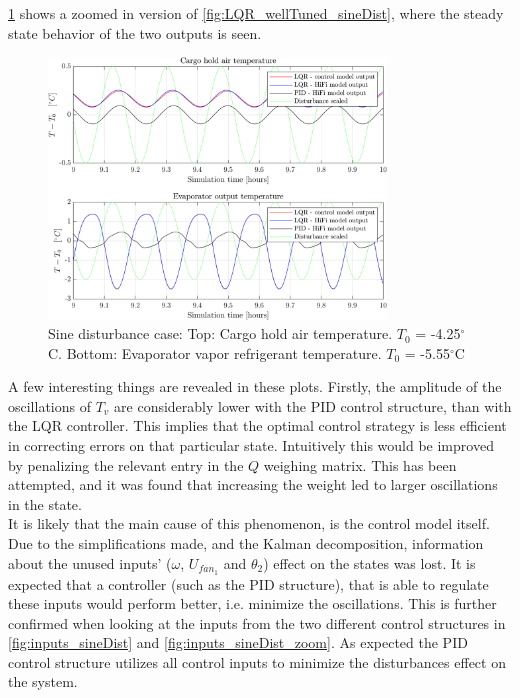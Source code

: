 \noindent \cref{fig:LQR_wellTuned_sineDist_zoom} shows a zoomed in version of \cref{fig:LQR_wellTuned_sineDist}, where the steady state behavior of the two outputs is seen.

\begin{figure}[H]
	\centering
	\includegraphics[width=0.8\textwidth]{Graphics/fig_LQRvsKresten_sineDist_zoom.png}
	\caption{Sine disturbance case: Top: Cargo hold air temperature. $T_0$ = -4.25$^{\circ}$C. Bottom: Evaporator vapor refrigerant temperature. $T_0$ = -5.55$^{\circ}$C}
	\label{fig:LQR_wellTuned_sineDist_zoom}
\end{figure}

\noindent A few interesting things are revealed in these plots. Firstly, the amplitude of the oscillations of $T_v$ are considerably lower with the PID control structure, than with the LQR controller. This implies that the optimal control strategy is less efficient in correcting errors on that particular state. Intuitively this would be improved by penalizing the relevant entry in the $Q$ weighing matrix. This has been attempted, and it was found that increasing the weight led to larger oscillations in the state.\\

It is likely that the main cause of this phenomenon, is the control model itself. Due to the simplifications made, and the Kalman decomposition, information about the unused inputs' ($\omega$, $U_{fan_1}$ and $\theta_2$) effect on the states was lost. It is expected that a controller (such as the PID structure), that is able to regulate these inputs would perform better, i.e. minimize the oscillations. This is further confirmed when looking at the inputs from the two different control structures in \cref{fig:inputs_sineDist} and \cref{fig:inputs_sineDist_zoom}. As expected the PID control structure utilizes all control inputs to minimize the disturbances effect on the system.\\

